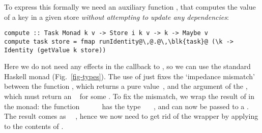 To express this formally we need an auxiliary function , that
computes the value of a key in a given store \emph{without attempting to update
any dependencies}:
\begin{verbatim}
compute :: Task Monad k v -> Store i k v -> k -> Maybe v
compute task store = fmap runIdentity@\,@.@\,\blk{task}@ (\k -> Identity (getValue k store))
\end{verbatim}

\noindent
Here we do not need any effects in the  callback to , so
we can use the standard Haskell  monad (Fig.~\ref{fig-types}).
The use of  just fixes the `impedance mismatch' between the
function , which returns a pure value~, and the 
argument of the , which must return an ~ for some .
To fix the mismatch, we wrap the result of  in the 
monad: the function
\hs{\@@k}~\hs{->}~~~~
has the type ~\hs{->}~~, and can now be passed to a
. The result comes as ~~, hence we now
need to get rid of the  wrapper by applying  to the
contents of .

